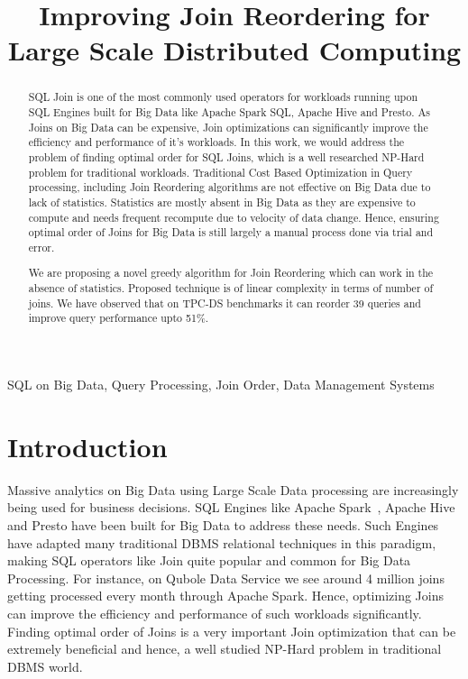 \documentclass[conference]{IEEEtran}
\begin{document}
\title{Improving Join Reordering for Large Scale Distributed Computing\\
}

\author{
\and
{}
}

\maketitle

\begin{abstract}
SQL Join is one of the most commonly used operators for workloads running upon SQL Engines built for Big Data like Apache Spark SQL, Apache Hive and Presto. As Joins on Big Data can be expensive, Join optimizations can significantly improve the efficiency and performance of it's workloads. In this work, we would address the problem of finding optimal order for SQL Joins, which is a well researched NP-Hard problem for traditional workloads. Traditional Cost Based Optimization in Query processing, including Join Reordering algorithms are not effective on Big Data due to lack of statistics. Statistics are mostly absent in Big Data as they are expensive to compute and needs frequent recompute due to velocity of data change. Hence, ensuring optimal order of Joins for Big Data is still largely a manual process done via trial and error.

We are proposing a novel greedy algorithm for Join Reordering which can work in the absence of statistics. Proposed technique is of linear complexity in terms of number of joins. We have observed that on TPC-DS benchmarks it can reorder 39 queries and improve query performance upto 51\%.
\end{abstract}

\begin{IEEEkeywords}
SQL on Big Data, Query Processing, Join Order, Data Management Systems
\end{IEEEkeywords}

\section{Introduction}
\label{sec:intro} 
Massive analytics on Big Data using Large Scale Data processing are increasingly being used for business decisions. SQL Engines like Apache Spark~\cite{b9}, Apache Hive~\cite{b10} and Presto have been built for Big Data to address these needs. Such Engines have adapted many traditional DBMS relational techniques in this paradigm, making SQL operators like Join quite popular and common for Big Data Processing. For instance, on Qubole Data Service we see around 4 million joins getting processed every month through Apache Spark. Hence, optimizing Joins can improve the efficiency and performance of such workloads significantly. Finding optimal order of Joins is a very important Join optimization that can be extremely beneficial and hence, a well studied NP-Hard problem in traditional DBMS world.
\end{document}
